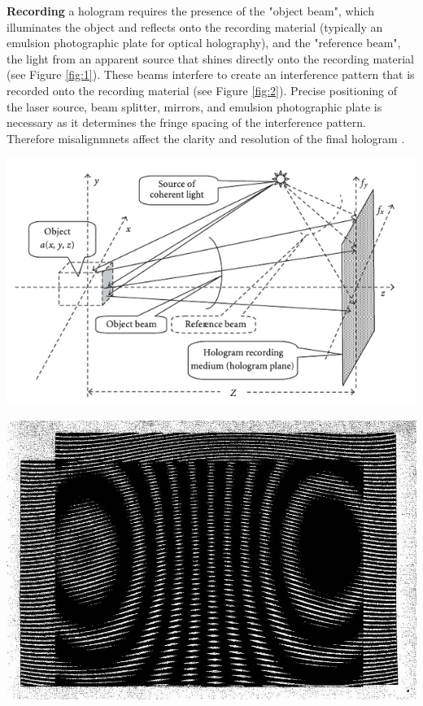 \documentclass[12pt]{article}
\begin{document}
\textbf{Recording} a hologram requires the presence of the "object beam", which illuminates the object and reflects onto the recording material (typically an emulsion photographic plate for optical holography), and the
"reference beam", the light from an apparent source that shines directly onto the recording material
\cite{UCDholo,basicholo1} (see Figure \ref{fig:1}).
These beams interfere to create an interference pattern that is recorded onto the recording material (see Figure \ref{fig:2}). Precise positioning of the laser source, beam splitter, mirrors, and emulsion photographic plate is necessary as it determines the
fringe spacing of the interference pattern. Therefore misalignmnets affect the clarity and resolution of the final hologram
\cite{UCDholo,collier2013optical}.

\begin{minipage}{.51\textwidth}
    \captionsetup{hypcap=false}
    \centering
    \includegraphics[width=\linewidth]{hologram construction.png}
    \label{fig:1}
\end{minipage}
\hfill
\begin{minipage}{.48\textwidth}
    \captionsetup{hypcap=false}
    \centering
    \includegraphics[width=\linewidth]{holo interference.jpg}
    \label{fig:2}
\end{minipage}
\end{document}

